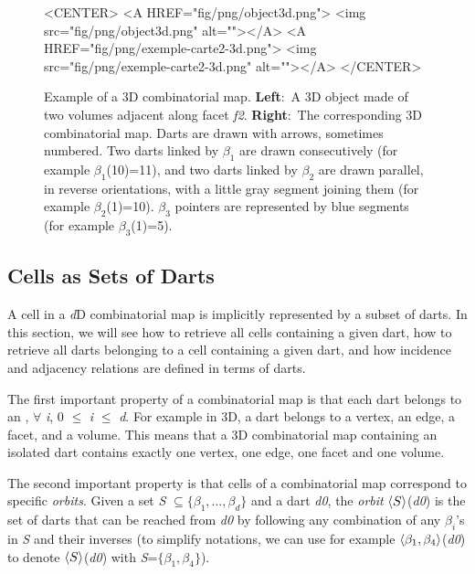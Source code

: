 \begin{figure}
\begin{ccHtmlOnly}
    <CENTER>
    <A HREF="fig/png/object3d.png">
    <img src="fig/png/object3d.png" alt=""></A>
    <A HREF="fig/png/exemple-carte2-3d.png">
        <img src="fig/png/exemple-carte2-3d.png" alt=""></A>
    </CENTER>
    \end{ccHtmlOnly}
    \caption{Example of a 3D combinatorial map. \textbf{Left}:~A 3D object
      made of two volumes adjacent along facet \emph{f2}. \textbf{Right}:~The
      corresponding 3D combinatorial map.  Darts are drawn with
      arrows, sometimes numbered.  Two darts linked by $\beta_1$ are
      drawn consecutively (for example $\beta_1$(10)=11), and two
      darts linked by $\beta_2$ are drawn parallel, in reverse
      orientations, with a little gray segment joining them (for
      example $\beta_2$(1)=10).  $\beta_3$ pointers are represented by
      blue segments (for example $\beta_3$(1)=5).}
    \label{fig-exemple-carte3d}
\end{figure}

\subsection{Cells as Sets of Darts}\label{ssec-cells-in-map}
A cell in a \emph{d}D combinatorial map is implicitly represented by a
subset of darts.
In this section, we will see how to retrieve all cells containing a
given dart, how to retrieve all darts belonging to a cell containing a
given dart, and how incidence and adjacency relations are defined in
terms of darts.

The first important property of a combinatorial map is that
each dart belongs to an , $\forall$ \emph{i}, 0 $\leq$ \emph{i} $\leq$ \emph{d}.
For example in 3D, a dart belongs to a vertex, an edge, a facet, and a
volume. This means that a 3D combinatorial map containing an isolated
dart contains exactly one vertex, one edge, one facet and one volume.


The second important property is that cells of a combinatorial map
correspond to specific \emph{orbits}.  Given a set 
\emph{S} $\subseteq \{\beta_1,\ldots,\beta_d\}$ and a dart
\emph{d0}, the \emph{orbit} $\langle{}S\rangle{}$(\emph{d0}) is the set of darts that can be
reached from \emph{d0} by following any combination of any $\beta_i$'s in \emph{S}
and their inverses (to simplify notations, we can use for example
$\langle{}\beta_1,\beta_4\rangle{}$(\emph{d0}) to denote $\langle{}S\rangle{}$(\emph{d0}) with
\emph{S}=$\{\beta_1,\beta_4\}$).

